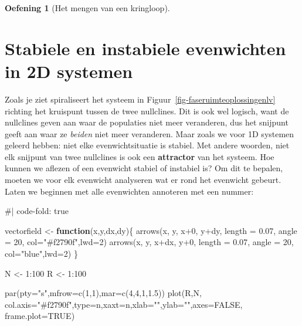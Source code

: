 \documentclass[
  a4paper,
]{scrbook}
\newenvironment{Shaded}{\begin{snugshade}}{\end{snugshade}}
\newcommand{\AttributeTok}[1]{\textcolor[rgb]{0.40,0.45,0.13}{#1}}
\newcommand{\CommentTok}[1]{\textcolor[rgb]{0.37,0.37,0.37}{#1}}
\newcommand{\ConstantTok}[1]{\textcolor[rgb]{0.56,0.35,0.01}{#1}}
\newcommand{\ControlFlowTok}[1]{\textcolor[rgb]{0.00,0.23,0.31}{\textbf{#1}}}
\newcommand{\DecValTok}[1]{\textcolor[rgb]{0.68,0.00,0.00}{#1}}
\newcommand{\FloatTok}[1]{\textcolor[rgb]{0.68,0.00,0.00}{#1}}
\newcommand{\FunctionTok}[1]{\textcolor[rgb]{0.28,0.35,0.67}{#1}}
\newcommand{\NormalTok}[1]{\textcolor[rgb]{0.00,0.23,0.31}{#1}}
\newcommand{\OtherTok}[1]{\textcolor[rgb]{0.00,0.23,0.31}{#1}}
\newcommand{\SpecialCharTok}[1]{\textcolor[rgb]{0.37,0.37,0.37}{#1}}
\newcommand{\StringTok}[1]{\textcolor[rgb]{0.13,0.47,0.30}{#1}}
\theoremstyle{definition}
\newtheorem{exercise}{Oefening}[chapter]
\theoremstyle{remark}
\begin{document}
\begin{exercise}[Het mengen van een
kringloop]
\begin{figure}
\end{figure}%

\section{Stabiele en instabiele evenwichten in 2D
systemen}\label{stabiele-en-instabiele-evenwichten-in-2d-systemen}

Zoals je ziet spiraliseert het systeem in
Figuur~\ref{fig-faseruimteoplossingenlv} richting het kruispunt tussen
de twee nullclines. Dit is ook wel logisch, want de nullclines geven aan
waar de populaties niet meer veranderen, dus het snijpunt geeft aan waar
ze \emph{beiden} niet meer veranderen. Maar zoals we voor 1D systemen
geleerd hebben: niet elke evenwichtsituatie is stabiel. Met andere
woorden, niet elk snijpunt van twee nullclines is ook een
\textbf{attractor} van het systeem. Hoe kunnen we aflezen of een
evenwicht stabiel of instabiel is? Om dit te bepalen, moeten we voor elk
evenwicht analyseren wat er rond het evenwicht gebeurt. Laten we
beginnen met alle evenwichten annoteren met een nummer:

\begin{Shaded}
\begin{Highlighting}[]
\CommentTok{\#| code{-}fold: true}

\NormalTok{vectorfield }\OtherTok{\textless{}{-}} \ControlFlowTok{function}\NormalTok{(x,y,dx,dy)\{}
  \FunctionTok{arrows}\NormalTok{(x, y, x}\SpecialCharTok{+}\DecValTok{0}\NormalTok{, y}\SpecialCharTok{+}\NormalTok{dy, }\AttributeTok{length =} \FloatTok{0.07}\NormalTok{, }\AttributeTok{angle =} \DecValTok{20}\NormalTok{, }\AttributeTok{col=}\StringTok{"\#f2790f"}\NormalTok{,}\AttributeTok{lwd=}\DecValTok{2}\NormalTok{)}
  \FunctionTok{arrows}\NormalTok{(x, y, x}\SpecialCharTok{+}\NormalTok{dx, y}\SpecialCharTok{+}\DecValTok{0}\NormalTok{, }\AttributeTok{length =} \FloatTok{0.07}\NormalTok{, }\AttributeTok{angle =} \DecValTok{20}\NormalTok{, }\AttributeTok{col=}\StringTok{"blue"}\NormalTok{,}\AttributeTok{lwd=}\DecValTok{2}\NormalTok{)}
\NormalTok{\}}

\NormalTok{N }\OtherTok{\textless{}{-}} \DecValTok{1}\SpecialCharTok{:}\DecValTok{100}
\NormalTok{R }\OtherTok{\textless{}{-}} \DecValTok{1}\SpecialCharTok{:}\DecValTok{100}

\FunctionTok{par}\NormalTok{(}\AttributeTok{pty=}\StringTok{"s"}\NormalTok{,}\AttributeTok{mfrow=}\FunctionTok{c}\NormalTok{(}\DecValTok{1}\NormalTok{,}\DecValTok{1}\NormalTok{),}\AttributeTok{mar=}\FunctionTok{c}\NormalTok{(}\DecValTok{4}\NormalTok{,}\DecValTok{4}\NormalTok{,}\DecValTok{1}\NormalTok{,}\FloatTok{1.5}\NormalTok{))}
\FunctionTok{plot}\NormalTok{(R,N,  }\AttributeTok{col.axis=}\StringTok{"\#f2790f"}\NormalTok{,}\AttributeTok{type=}\StringTok{\textquotesingle{}n\textquotesingle{}}\NormalTok{,}\AttributeTok{xaxt=}\StringTok{\textquotesingle{}n\textquotesingle{}}\NormalTok{,}\AttributeTok{xlab=}\StringTok{""}\NormalTok{,}\AttributeTok{ylab=}\StringTok{""}\NormalTok{,}\AttributeTok{axes=}\ConstantTok{FALSE}\NormalTok{, }\AttributeTok{frame.plot=}\ConstantTok{TRUE}\NormalTok{)}


\end{Highlighting}
\end{Shaded}
\end{exercise}
\end{document}

